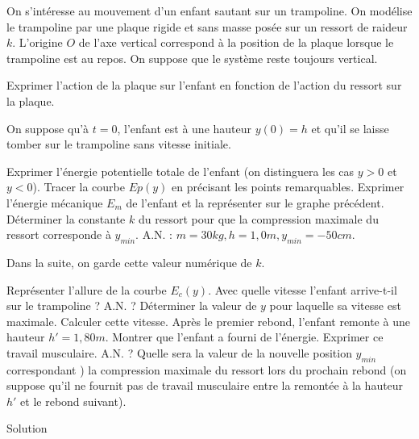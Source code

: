 \begin{Exercise}[title=Trampoline]
  On s'intéresse au mouvement d'un enfant sautant sur un trampoline. On modélise le trampoline par une plaque rigide et sans masse posée sur un ressort de raideur $k$. L'origine $O$ de l'axe vertical correspond à la position de la plaque lorsque le trampoline est au repos. On suppose que le système reste toujours vertical.


  \Question Exprimer l'action de la plaque sur l'enfant en fonction de l'action du ressort sur la plaque.

  On suppose qu'à $t=0$, l'enfant est à une hauteur $y(0)=h$ et qu'il se laisse tomber sur le trampoline sans vitesse initiale.

  \Question Exprimer l'énergie potentielle totale de l'enfant (on distinguera les cas $y>0$ et $y<0$). Tracer la courbe $Ep(y)$ en précisant les points remarquables.
  \Question Exprimer l'énergie mécanique $E_m$ de l'enfant et la représenter sur le graphe précédent.
  \Question Déterminer la constante $k$ du ressort pour que la compression maximale du ressort corresponde à $y_{min}$. A.N. : $m=30kg, h=1,0m, y_{min}=-50cm$.

  Dans la suite, on garde cette valeur numérique de $k$.

  \Question Représenter l'allure de la courbe $E_c(y)$.
  \Question Avec quelle vitesse l'enfant arrive-t-il sur le trampoline ? A.N. ?
  \Question Déterminer la valeur de $y$ pour laquelle sa vitesse est maximale. Calculer cette vitesse.
  \Question Après le premier rebond, l'enfant remonte à une hauteur $h'=1,80m$. Montrer que l'enfant a fourni de l'énergie. Exprimer ce travail musculaire. A.N. ? Quelle sera la valeur de la nouvelle position $y_{min}$ correspondant ) la compression maximale du ressort lors du prochain rebond (on suppose qu'il ne fournit pas de travail musculaire entre la remontée à la hauteur $h'$ et le rebond suivant).

\end{Exercise}
\begin{Answer}
  Solution
\end{Answer}
